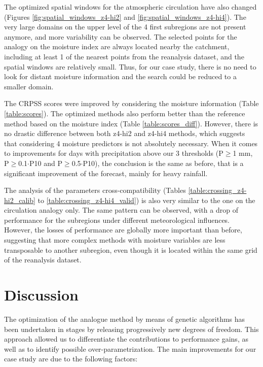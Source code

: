 \documentclass[twocol]{ametsoc}
\begin{document}
The optimized spatial windows for the atmospheric circulation have also changed (Figures \ref{fig:spatial_windows_z4-hi2} and \ref{fig:spatial_windows_z4-hi4}). The very large domains on the upper level of the 4 first subregions are not present anymore, and more variability can be observed. The selected points for the analogy on the moisture index are always located nearby the catchment, including at least 1 of the nearest points from the reanalysis dataset, and the spatial windows are relatively small. Thus, for our case study, there is no need to look for distant moisture information and the search could be reduced to a smaller domain. 

The CRPSS scores were improved by considering the moisture information (Table \ref{table:scores}). The optimized methods also perform better than the reference method based on the moisture index (Table \ref{table:scores_diff}). However, there is no drastic difference between both z4-hi2 and z4-hi4 methods, which suggests that considering 4 moisture predictors is not absolutely necessary. When it comes to improvements for days with precipitation above our 3 thresholds (P\(\geq\)1 mm, P\(\geq\)0.1\(\cdot\)P10 and P\(\geq\)0.5\(\cdot\)P10), the conclusion is the same as before, that is a significant improvement of the forecast, mainly for heavy rainfall.

The analysis of the parameters cross-compatibility (Tables \ref{table:crossing_z4-hi2_calib} to \ref{table:crossing_z4-hi4_valid}) is also very similar to the one on the circulation analogy only. The same pattern can be observed, with a drop of performance for the subregions under different meteorological influences. However, the losses of performance are globally more important than before, suggesting that more complex methods with moisture variables are less transposable to another subregion, even though it is located within the same grid of the reanalysis dataset.


\section{Discussion}

The optimization of the analogue method by means of genetic algorithms has been undertaken in stages by releasing progressively new degrees of freedom. This approach allowed us to differentiate the contributions to performance gains, as well as to identify possible over-parametrization. The main improvements for our case study are due to the following factors:
\end{document}
